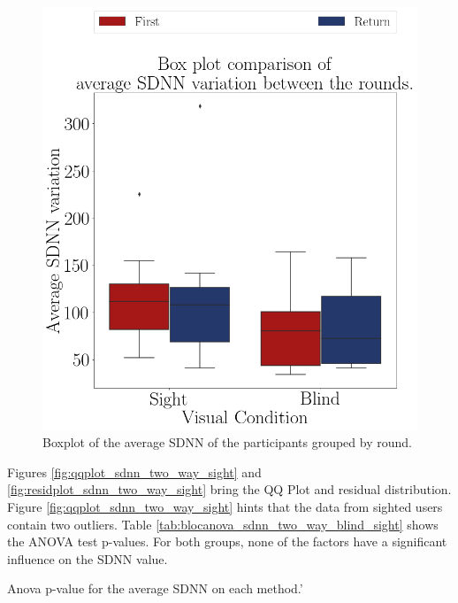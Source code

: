 \begin{figure}[!htb]
\begin{minipage}{0.45\textwidth}
        \includegraphics[width = 0.8\linewidth]{Resultados/ECG/Figuras/png/boxplot_ecg_sdnn_4_rounds.png}
        \caption{Boxplot of the average SDNN of the participants grouped by round.}
        \label{fig:boxplot_ecg_sdnn_4_rounds}
    \end{minipage}
\end{figure}
 
%
%

Figures \ref{fig:qqplot_sdnn_two_way_sight} and \ref{fig:residplot_sdnn_two_way_sight} bring the QQ Plot and residual distribution. Figure \ref{fig:qqplot_sdnn_two_way_sight} hints that the data from sighted users contain two outliers. Table \ref{tab:blocanova_sdnn_two_way_blind_sight} shows the ANOVA test p-values. For both groups, none of the factors have a significant influence on the SDNN value.

\begin{table}
    \caption{Anova p-value for the average SDNN on each method.'}
    \label{tab:blocanova_sdnn_two_way_blind_sight}
\begin{minipage}{0.45\textwidth}
    
\end{minipage}
\begin{minipage}{0.45\textwidth}
    
\end{minipage}
\end{table}

